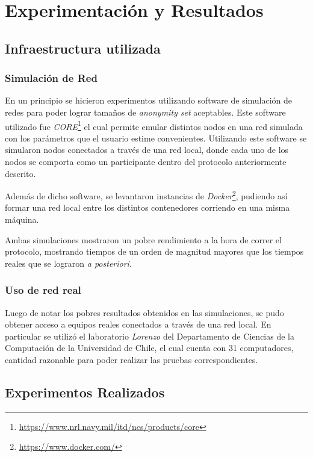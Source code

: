 \chapter{Experimentación y Resultados}\label{cap5}
\section{Infraestructura utilizada}

\subsection{Simulación de Red}

En un principio se hicieron experimentos utilizando software 
de simulación de redes para poder lograr tamaños de 
\emph{anonymity set} aceptables. Este software utilizado fue 
\emph{CORE}\footnote{\url{https://www.nrl.navy.mil/itd/ncs/products/core}} 
el cual permite emular distintos nodos en una red simulada 
con los parámetros que el usuario estime convenientes. Utilizando 
este software se simularon nodos conectados a través de una red local, 
donde cada uno de los nodos se comporta como un participante dentro 
del protocolo anteriormente descrito.

Además de dicho software, se levantaron instancias de 
\emph{Docker}\footnote{\url{https://www.docker.com/}}, pudiendo así 
formar una red local entre los distintos contenedores corriendo 
en una misma máquina.

Ambas simulaciones mostraron un pobre rendimiento a la hora de 
correr el protocolo, mostrando tiempos de un orden de magnitud 
mayores que los tiempos reales que se lograron \emph{a posteriori}.

\subsection{Uso de red real}

Luego de notar los pobres resultados obtenidos en las simulaciones, se 
pudo obtener acceso a equipos reales conectados a través de una red 
local. En particular se utilizó el laboratorio \emph{Lorenzo} del 
Departamento de Ciencias de la Computación de la Universidad de Chile, el 
cual cuenta con 31 computadores, cantidad razonable para poder realizar 
las pruebas correspondientes.

\section{Experimentos Realizados}

